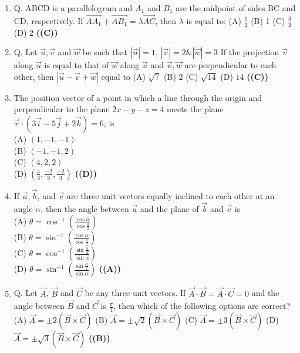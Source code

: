 \documentclass{article}
\begin{document}
\begin{enumerate}
(A) $\cos^{-1}\sqrt{1 - \frac{\sqrt{3}}{2}}$
(B) $\cos^{-1}\sqrt{\frac{\sqrt{3}}{2} - 1}$
(C) $\sin^{-1}\sqrt{1 - \frac{\sqrt{3}}{2}}$
(D) $\sin^{-1}\sqrt{\frac{\sqrt{3}}{2} - 1}$ \hfill \textbf{((D))}
\item Q. ABCD is a parallelogram and $A_1$ and $B_1$ are the midpoint of sides BC and CD, respectively. If $\vec{AA_1} + \vec{AB_1} = \lambda \vec{AC}$, then $\lambda$ is equal to:
(A) $\frac{1}{2}$
(B) 1
(C) $\frac{3}{2}$
(D) 2 \hfill \textbf{((C))}
\item Q. Let $\vec{u}, \vec{v}$ and $\vec{w}$ be such that $|\vec{u}| = 1$, $|\vec{v}| = 2\&|\vec{w}| = 3$ If the projection $\vec{v}$ along $\vec{u}$ is equal to that of $\vec{w}$ along $\vec{u}$ and $\vec{v}, \vec{w}$ are perpendicular to each other, then $|\vec{u} - \vec{v} + \vec{w}|$ equal to
(A) $\sqrt{7}$
(B) $2$
(C) $\sqrt{14}$
(D) $14$ \hfill \textbf{((C))}
\item The position vector of a point in which a line through the origin and perpendicular to the plane $2x - y - z = 4$ meets the plane $\vec{r} \cdot (3\vec{i} - 5\vec{j} + 2\vec{k}) = 6$, is\\
(A) $(1,-1,-1)$\\
(B) $(-1,-1,2)$\\
(C) $(4,2,2)$\\
(D) $(\frac{4}{3}, \frac{-2}{3}, \frac{-2}{3})$ \hfill \textbf{((D))}
\item If $\vec{a}, \vec{b}$, and $\vec{c}$ are three unit vectors equally inclined to each other at an angle $\alpha$, then the angle between $\vec{a}$ and the plane of $\vec{b}$ and $\vec{c}$ is\\
(A) $\theta = \cos^{-1} (\frac{\cos \alpha}{\cos \frac{\alpha}{2}})$\\
(B) $\theta = \sin^{-1} (\frac{\cos \alpha}{\cos \frac{\alpha}{2}})$\\
(C) $\theta = \cos^{-1} (\frac{\sin \frac{\alpha}{2}}{\sin \alpha})$\\
(D) $\theta = \sin^{-1} (\frac{\sin \frac{\alpha}{2}}{\sin \alpha})$ \hfill \textbf{((A))}
\item Q. Let $\vec{A}$, $\vec{B}$ and $\vec{C}$ be any three unit vectors. If $\vec{A} \cdot \vec{B} = \vec{A} \cdot \vec{C} = 0$ and the angle between $\vec{B}$ and $\vec{C}$ is $\frac{\pi}{4}$, then which of the following options are correct?
(A) $\vec{A} = \pm 2(\vec{B} \times \vec{C})$
(B) $\vec{A} = \pm \sqrt{2}(\vec{B} \times \vec{C})$
(C) $\vec{A} = \pm 3(\vec{B} \times \vec{C})$
(D) $\vec{A} = \pm \sqrt{3}(\vec{B} \times \vec{C})$ \hfill \textbf{((B))}
\end{enumerate}
\end{document}

